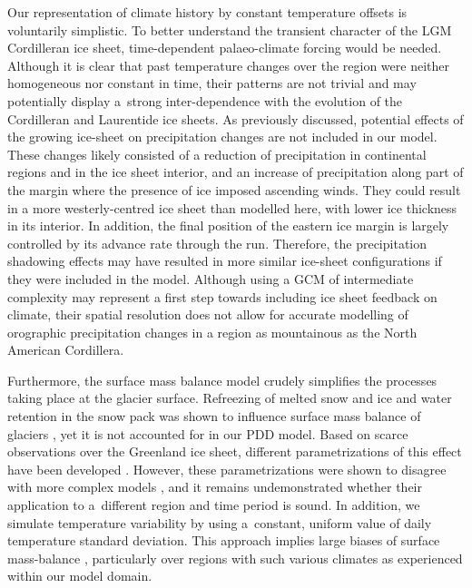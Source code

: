 \documentclass[tc, ms]{copernicus}
\begin{document}
Our representation of climate history by constant temperature offsets is voluntarily simplistic. To better understand the transient character of the LGM Cordilleran ice sheet, time-dependent palaeo-climate forcing would be needed. Although it is clear that past temperature changes over the region were neither homogeneous nor constant in time, their patterns are not trivial and may potentially display a~strong inter-dependence with the evolution of the Cordilleran and Laurentide ice sheets. As previously discussed, potential effects of the growing ice-sheet on precipitation changes are not included in our model. These changes likely consisted of a reduction of precipitation in continental regions and in the ice sheet interior, and an increase of precipitation along part of the margin where the presence of ice imposed ascending winds. They could result in a more westerly-centred ice sheet than modelled here, with lower ice thickness in its interior. In addition, the final position of the eastern ice margin is largely controlled by its advance rate through the run. Therefore, the precipitation shadowing effects may have resulted in more similar ice-sheet configurations if they were included in the model. Although using a GCM of intermediate complexity \citep{yoshimori-etal-2001,calov-etal-2002,abeouchi-etal-2007,charbit-etal-2013} may represent a first step towards including ice sheet feedback on climate, their spatial resolution does not allow for accurate modelling of orographic precipitation changes in a region as mountainous as the North American Cordillera.

Furthermore, the surface mass balance model crudely simplifies the processes taking place at the glacier surface. Refreezing of melted snow and ice and water retention in the snow pack was shown to influence surface mass balance of glaciers \citep{trabant-mayo-1985}, yet it is not accounted for in our PDD model. Based on scarce observations over the Greenland ice sheet, different parametrizations of this effect have been developed \citep{janssens-huybrechts-2000,fausto-etal-2009b}. However, these parametrizations were shown to disagree with more complex models \citep{reijmer-etal-2012}, and it remains undemonstrated whether their application to a~different region and time period is sound. In addition, we simulate temperature variability by using a~constant, uniform value of daily temperature standard deviation. This approach implies large biases of surface mass-balance \citep{charbit-etal-2013,rogozhina-rau-2014,seguinot-2013}, particularly over regions with such various climates as experienced within our model domain.
\end{document}
